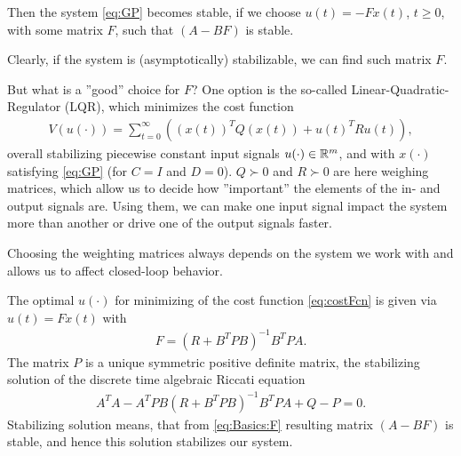 Then the system \eqref{eq:GP} becomes stable, if we choose $u(t) = -Fx(t)$, $t \geq 0$, with some matrix $F$, such that $(A - BF)$ is stable.

Clearly, if the system is (asymptotically) stabilizable, we can find such matrix $F$. 

But what is a ''good'' choice for $F$? One option is the so-called Linear-Quadratic-Regulator (LQR), which minimizes the cost function 
\begin{align}
\label{eq:costFcn}
V(u(\cdot)) = \sum_{t = 0}^\infty \left( (x(t))^T Q (x(t)) + u(t)^T R u(t)\right),
\end{align}
overall stabilizing piecewise constant input signals $u(\cdot) \in {\mathbb{R}}^m$, and with $x(\cdot)$ satisfying \eqref{eq:GP} (for $C = I$ and $D = 0$). 
$Q \succ 0$ and $R \succ 0$ are here weighing matrices, which allow us to decide how ''important'' the elements of the in- and output signals are.  
Using them, we can make one input signal impact the system more than another or drive one of the output signals faster. 

Choosing the weighting matrices always depends on the system we work with and allows us to affect closed-loop behavior.   

The optimal $u(\cdot)$ for minimizing of the cost function \eqref{eq:costFcn} is given via $u(t) = F x(t)$ with
\begin{align}
\label{eq:Basics:F}
F = (R + B^T P B)^{-1}B^TPA.
\end{align}
The matrix $P$ is a unique symmetric positive definite matrix, the stabilizing solution of the discrete time algebraic Riccati equation
\begin{align}
 A^TA - A^T P B (R + B^T P B)^{-1} B^T P A + Q - P = 0.%
\end{align}
Stabilizing solution means, that from \eqref{eq:Basics:F} resulting matrix $(A - BF)$ is stable, and hence this solution stabilizes our system. 




 



